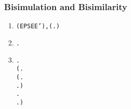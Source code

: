 \begin{frame}[fragile]
\frametitle{Bisimulation and Bisimilarity}
\begin{small}
\begin{enumerate}
\item \begin{alltt}
 (EPS E E'),  \HOLSymConst{=} (\HOLTokenLambda{} .  \HOLTokenTransBegin\HOLSymConst{\ensuremath{\tau}}\HOLTokenTransEnd {})\HOLSymConst{\HOLTokenSupStar{}}
\end{alltt}
\item \begin{alltt}
 \HOLTokenWeakTransBegin{}\HOLTokenWeakTransEnd {} \HOLSymConst{\HOLTokenEquiv{}} \HOLSymConst{\HOLTokenExists{}} .  \HOLSymConst{\HOLTokenEPS}  \HOLSymConst{\HOLTokenConj{}}  \HOLTokenTransBegin{}\HOLTokenTransEnd {} \HOLSymConst{\HOLTokenConj{}}  \HOLSymConst{\HOLTokenEPS} 
\end{alltt}
\item \begin{scriptsize}\begin{alltt}
  \HOLSymConst{\HOLTokenEquiv{}}
\HOLSymConst{\HOLTokenForall{}} .
       \HOLSymConst{\HOLTokenImp{}}
    (\HOLSymConst{\HOLTokenForall{}}.
         (\HOLSymConst{\HOLTokenForall{}}.
               \HOLTokenTransBegin{} \HOLTokenTransEnd {} \HOLSymConst{\HOLTokenImp{}}
              \HOLSymConst{\HOLTokenExists{}}.  \HOLTokenWeakTransBegin{} \HOLTokenWeakTransEnd {} \HOLSymConst{\HOLTokenConj{}}   ) \HOLSymConst{\HOLTokenConj{}}
         \HOLSymConst{\HOLTokenForall{}}.
              \HOLTokenTransBegin{} \HOLTokenTransEnd {} \HOLSymConst{\HOLTokenImp{}} \HOLSymConst{\HOLTokenExists{}}.  \HOLTokenWeakTransBegin{} \HOLTokenWeakTransEnd {} \HOLSymConst{\HOLTokenConj{}}   ) \HOLSymConst{\HOLTokenConj{}}

\end{alltt}
\end{scriptsize}
\end{enumerate}
\end{small}
\end{frame}
